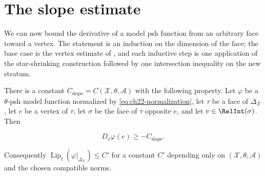 \section{The slope estimate}
\label{sec:ch22-slope}

We can now bound the derivative of a model psh function from an arbitrary
face toward a vertex.  The statement is an induction on the dimension of the
face; the base case is the vertex estimate of
, and each inductive step is one application
of the star-shrinking construction followed by one intersection inequality
on the new stratum.

\begin{proposition}
\label{prop:ch22-slope-estimate}
There is a constant \(C_{\mathrm{slope}}=C(\mathcal X,\theta,\mathcal A)\)
with the following property.  Let \(\varphi\) be a \(\theta\)-psh model
function normalized by \eqref{eq:ch22-normalization}, let \(\tau\) be a face
of \(\Delta_{\mathcal X}\), let \(e\) be a vertex of \(\tau\), let \(\sigma\)
be the face of \(\tau\) opposite \(e\), and let \(v\in\RelInt(\sigma)\).
Then

\[
                    D_v\varphi(e)\geq-C_{\mathrm{slope}} .
\tag{22.43}\label{eq:ch22-slope-lower-bound}
\]

Consequently \(\operatorname{Lip}_{\mathrm f}(\varphi|_{\Delta_{\mathcal X}})
\leq C'\) for a constant \(C'\) depending only on
\((\mathcal X,\theta,\mathcal A)\) and the chosen compatible norms.
\end{proposition}

